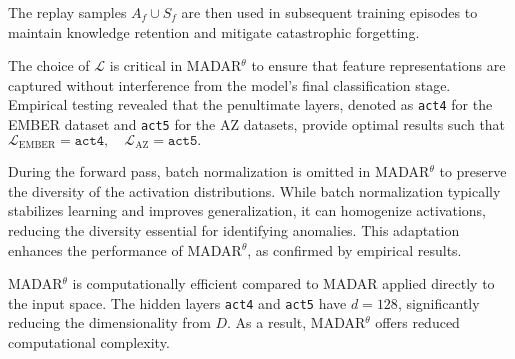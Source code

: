 The replay samples \( A_f \cup S_f \) are then used in subsequent training episodes to maintain knowledge retention and mitigate catastrophic forgetting.

The choice of \( \mathcal{L} \) is critical in MADAR$^\theta$ to ensure that feature representations are captured without interference from the model's final classification stage. Empirical testing revealed that the penultimate layers, denoted as \texttt{act4} for the EMBER dataset and \texttt{act5} for the AZ datasets, provide optimal results such that $\mathcal{L}_{\text{EMBER}} = \texttt{act4}, \quad \mathcal{L}_{\text{AZ}} = \texttt{act5}.$


During the forward pass, batch normalization is omitted in MADAR$^\theta$ to preserve the diversity of the activation distributions. While batch normalization typically stabilizes learning and improves generalization, it can homogenize activations, reducing the diversity essential for identifying anomalies. This adaptation enhances the performance of MADAR$^\theta$, as confirmed by empirical results.






MADAR$^\theta$ is computationally efficient compared to MADAR applied directly to the input space. The hidden layers \texttt{act4} and \texttt{act5} have \( d = 128 \), significantly reducing the dimensionality from \( D \). As a result, MADAR$^\theta$ offers reduced computational complexity.







